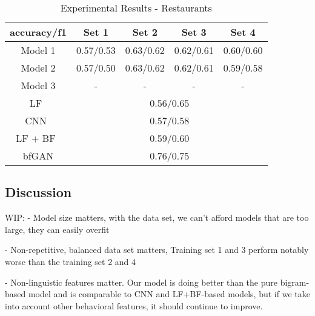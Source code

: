 \documentclass[conference, 11pt]{IEEEtran} %
\theoremstyle{plain}
\theoremstyle{definition}
\begin{document}
\begin{table}[H]
\small
\caption{Experimental Results - Restaurants}
\centering
\begin{tabular}{|c|c|c|c|c|}
\hline
 accuracy/f1 & Set 1 & Set 2 & Set 3 & Set 4 \\ \hline
Model 1 & 0.57/0.53 & 0.63/0.62 & 0.62/0.61 & 0.60/0.60 \\ \hline
Model 2 & 0.57/0.50 & 0.63/0.62 & 0.62/0.61 & 0.59/0.58 \\ \hline
Model 3 & - & - & - & - \\ \hline
LF~\cite{Tang2020} & \multicolumn{4}{c|}{0.56/0.65} \\ \hline
CNN~\cite{Tang2020} & \multicolumn{4}{c|}{0.57/0.58} \\ \hline
LF + BF~\cite{Tang2020} & \multicolumn{4}{c|}{0.59/0.60} \\ \hline
bfGAN\cite{Tang2020}& \multicolumn{4}{c|}{0.76/0.75} \\
\hline
\end{tabular}
\label{exp-restaurants}

\end{table}




\subsection{Discussion}
WIP:
- Model size matters, with the data set, we can't afford models that are too large, they can easily overfit

- Non-repetitive, balanced data set matters, Training set 1 and 3 perform notably worse than the training set 2 and 4

- Non-linguistic features matter. Our model is doing better than the pure bigram-based model and is comparable to CNN and LF+BF-based models, but if we take into account other behavioral features, it should continue to improve.
\end{document}
